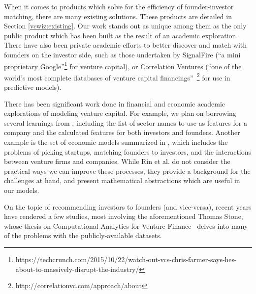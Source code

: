 When it comes to products which solve for the efficiency of founder-investor matching, there are many existing solutions. These products are detailed in Section \ref{vcwiz:existing}. Our work stands out as unique among them as the only public product which has been built as the result of an academic exploration. There have also been private academic efforts to better discover and match with founders on the investor side, such as those undertaken by SignalFire (``a  mini proprietary Google''\footnote{https://techcrunch.com/2015/10/22/watch-out-vcs-chris-farmer-says-hes-about-to-massively-disrupt-the-industry/} for venture capital), or Correlation Ventures (``one of the world's most complete databases of venture capital financings''~\footnote{http://correlationvc.com/approach/about} for use in predictive models).

There has been significant work done in financial and economic academic explorations of modeling venture capital. For example, we plan on borrowing several learnings from \cite{2017arXiv170604229H}, including the list of sector names to use as features for a company and the calculated features for both investors and founders. Another example is the set of economic models summarized in \cite{venture-survey}, which includes the problems of picking startups, matching founders to investors, and the interactions between venture firms and companies. While Rin et al. do not consider the practical ways we can improve these processes, they provide a background for the challenges at hand, and present mathematical abstractions which are useful in our models.

On the topic of recommending investors to founders (and vice-versa), recent years have rendered a few studies, most involving the aforementioned Thomas Stone, whose thesis on Computational Analytics for Venture Finance~\cite{stone2014computational} delves into many of the problems with the publicly-available datasets.
